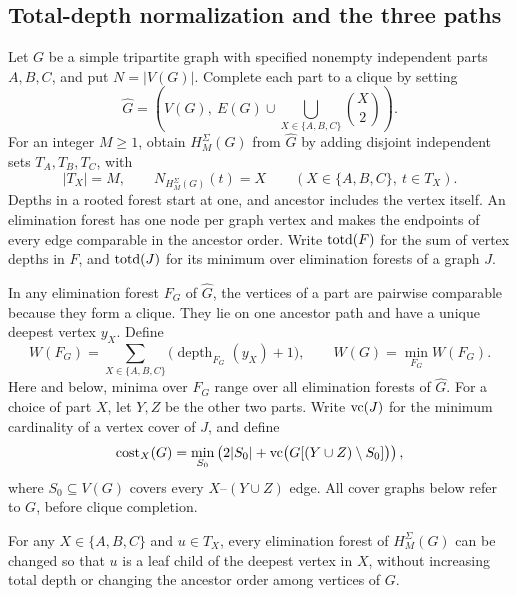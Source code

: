 \subsection{Total-depth normalization and the three paths}
\label{app:total-depth-tools}

Let $G$ be a simple tripartite graph with specified nonempty
independent parts $A,B,C$, and put $N=|V(G)|$. Complete each part
to a clique by setting
\[
 \widehat G=\left(V(G),\ E(G)\cup
                 \bigcup_{X\in\{A,B,C\}}\binom{X}{2}\right).
\]
For an integer $M\ge1$, obtain
$H^\Sigma_M(G)$ from $\widehat G$ by adding disjoint independent
sets $T_A,T_B,T_C$, with
\[
 |T_X|=M,\qquad N_{H^\Sigma_M(G)}(t)=X
 \qquad(X\in\{A,B,C\},\ t\in T_X).
\]
Depths in a rooted
forest start at one, and ancestor includes the vertex itself. An
elimination forest has one node per graph vertex and makes the
endpoints of every edge comparable in the ancestor order.
Write $\operatorname{totd}(F)$ for the sum of vertex depths in $F$, and
$\operatorname{totd}(J)$ for its minimum over elimination forests of a graph $J$.

In any elimination forest $F_G$ of $\widehat G$, the vertices of a
part are pairwise comparable because they form a clique. They lie
on one ancestor path and have a unique deepest vertex $y_X$. Define
\[
 W(F_G)=\sum_{X\in\{A,B,C\}}
             \bigl(\operatorname{depth}_{F_G}(y_X)+1\bigr),
 \qquad W(G)=\min_{F_G}W(F_G).
\]
Here and below, minima over $F_G$ range over all elimination forests
of $\widehat G$.
For a choice of part $X$, let $Y,Z$ be the other two parts. Write
$\operatorname{vc}(J)$ for the minimum cardinality of a vertex cover of $J$, and
define
\[
 \operatorname{cost}_X(G)=\min_{S_0}
 \left(2|S_0|+\operatorname{vc}\bigl(G[(Y\cup Z)\setminus S_0]\bigr)\right),
\]
where $S_0\subseteq V(G)$ covers every $X$--$(Y\cup Z)$ edge.
All cover graphs below refer to $G$, before clique completion.

\begin{lemma}
\label{lem:added-vertex-move}
For any $X\in\{A,B,C\}$ and $u\in T_X$, every elimination forest
of $H^\Sigma_M(G)$ can be changed so that $u$ is a leaf child of
the deepest vertex in $X$, without increasing total depth or changing
the ancestor order among vertices of $G$.
\end{lemma}

